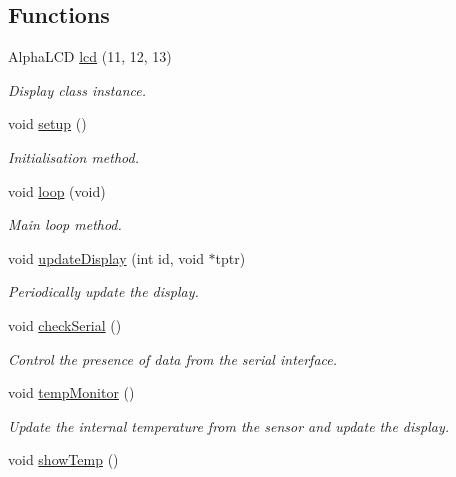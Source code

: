 \subsection*{Functions}
\begin{DoxyCompactItemize}
\item 
Alpha\-L\-C\-D \hyperlink{_meditech___chip_kit_control_panel_8pde_ae0b100905fb0ed88dddaafda0aa05379}{lcd} (11, 12, 13)
\begin{DoxyCompactList}\small\item\em Display class instance. \end{DoxyCompactList}\item 
void \hyperlink{_meditech___chip_kit_control_panel_8pde_a4fc01d736fe50cf5b977f755b675f11d}{setup} ()
\begin{DoxyCompactList}\small\item\em Initialisation method. \end{DoxyCompactList}\item 
void \hyperlink{_meditech___chip_kit_control_panel_8pde_a0b33edabd7f1c4e4a0bf32c67269be2f}{loop} (void)
\begin{DoxyCompactList}\small\item\em Main loop method. \end{DoxyCompactList}\item 
void \hyperlink{_meditech___chip_kit_control_panel_8pde_a5a7516a22f178c51ec37c6c8167aaf70}{update\-Display} (int id, void $\ast$tptr)
\begin{DoxyCompactList}\small\item\em Periodically update the display. \end{DoxyCompactList}\item 
void \hyperlink{_meditech___chip_kit_control_panel_8pde_a318afc268cf08e16ff1e53698727ec77}{check\-Serial} ()
\begin{DoxyCompactList}\small\item\em Control the presence of data from the serial interface. \end{DoxyCompactList}\item 
void \hyperlink{_meditech___chip_kit_control_panel_8pde_a3428cc5f679f463cc86ff3d48874eedc}{temp\-Monitor} ()
\begin{DoxyCompactList}\small\item\em Update the internal temperature from the sensor and update the display. \end{DoxyCompactList}\item 
void \hyperlink{_meditech___chip_kit_control_panel_8pde_a89c0a8283a410b693ebef39173a8f493}{show\-Temp} ()

\end{DoxyCompactItemize}
